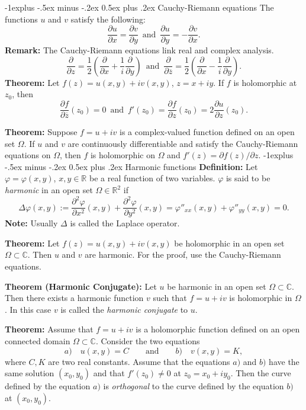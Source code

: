 \documentclass[10pt,landscape]{article}
\makeatletter
\renewcommand{\subsection}{\@startsection{subsection}{2}{0mm}%
                                {-1explus -.5ex minus -.2ex}%
                                {0.5ex plus .2ex}%
                                {\normalfont\normalsize\bfseries}}
\makeatother
\begin{document}
\begin{multicols}{3}
\subsection{Cauchy-Riemann equations}
The functions $u$ and $v$ satisfy the following:
$$\frac{\partial u}{\partial x} = \frac{\partial v}{\partial y} \, \text{ and } \, \frac{\partial u}{\partial y} = -\frac{\partial v}{\partial x}.$$
\textbf{Remark:} The Cauchy-Riemann equations link real and complex analysis.
$$\frac{\partial}{\partial z} = \frac{1}{2}\left(\frac{\partial }{\partial x} + \frac{1}{i} \frac{\partial}{\partial y}\right) \, \text{ and } \, \frac{\partial}{\partial \overline{z}} = \frac{1}{2}\left(\frac{\partial }{\partial x} - \frac{1}{i} \frac{\partial}{\partial y}\right).$$
\textbf{Theorem:} Let $f(z) = u(x, y) + iv(x, y)$, $z = x + iy$. If $f$ is holomorphic
at $z_0$, then
$$\frac{\partial f}{\partial \overline{z}}(z_0) = 0 \, \text{ and } \, f'(z_0) = \frac{\partial f}{\partial z}(z_0) = 2\frac{\partial u}{\partial z}(z_0).$$

\textbf{Theorem:} Suppose $f = u + iv$ is a complex-valued function defined on
an open set $\Omega$. If $u$ and $v$ are continuously differentiable and satisfy the
Cauchy-Riemann equations on $\Omega$, then $f$ is holomorphic on $\Omega$ and $f'(z) = \partial f(z)/ \partial z$.
\subsection{Harmonic functions}
\textbf{Definition:} Let $\varphi = \varphi(x, y)$, $x,y \in \mathbb{R}$ be a real function of two variables.
$\varphi$ is said to be \textit{harmonic} in an open set $\Omega \in \mathbb{R}^2$ if
$$\Delta \varphi(x, y) := \frac{\partial^2 \varphi}{\partial x^2}(x,y) + \frac{\partial^2 \varphi}{\partial y^2}(x,y) = \varphi''_{xx}(x,y) + \varphi''_{yy}(x,y) = 0.$$
\textbf{Note:} Usually $\Delta$ is called the Laplace operator.

\textbf{Theorem:} Let $f(z) = u(x, y) + iv(x, y)$ be holomorphic in an open set
$\Omega \subset \mathbb{C}$. Then $u$ and $v$ are harmonic. For the proof, use the Cauchy-Riemann equations.

\textbf{Theorem (Harmonic Conjugate):} Let $u$ be harmonic in an open set $\Omega \subset \mathbb{C}$. Then there exists a
harmonic function $v$ such that $f = u + iv$ is holomorphic in $\Omega$. In this case
$v$ is called the \textit{harmonic conjugate} to $u$.

\textbf{Theorem:} Assume that $f = u + iv$ is a holomorphic function defined on
an open connected domain $\Omega \subset \mathbb{C}$. Consider the two equations
$$a) \quad u(x, y) = C \qquad \text{and} \qquad b) \quad v(x, y) = K,$$ where $C, K$ are two real constants.
Assume that the equations $a)$ and $b)$ have the same solution $(x_0, y_0)$ and
that $f'(z_0) \neq 0$ at $z_0 = x_0 + iy_0.$ Then the curve defined by the equation $a)$
is \textit{orthogonal} to the curve defined by the equation $b)$ at $(x_0, y_0)$.


\end{multicols}
\end{document}
